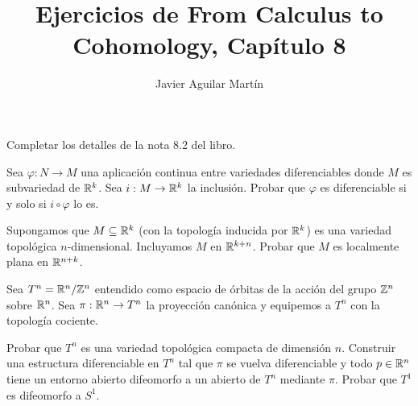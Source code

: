 \documentclass[twoside]{article}
\begin{document}
\title{Ejercicios de From Calculus to Cohomology, Capítulo 8}
\author{Javier Aguilar Martín}
\maketitle


\begin{ejercicio}{8.1}
Completar los detalles de la nota 8.2 del libro.
\end{ejercicio}
\begin{solucion}



\end{solucion}

\newpage

\begin{ejercicio}{8.2}

\end{ejercicio}
\begin{solucion}
Sea $\varphi:N\to M$ una aplicación continua entre variedades diferenciables donde $M$ es subvariedad de $\mathbb{R}^k$. Sea $i:M\to \mathbb{R}^k$ la inclusión. Probar que $\varphi$ es diferenciable si y solo si $i\circ\varphi$ lo es.
\end{solucion}
\newpage

\begin{ejercicio}{8.3}
Supongamos que $M\subseteq\mathbb{R}^k$ (con la topología inducida por $\mathbb{R}^k$) es una variedad topológica $n$-dimensional. Incluyamos $M$ en $\mathbb{R}^{k+n}$. Probar que $M$ es localmente plana en $\mathbb{R}^{n+k}$.
\end{ejercicio}
\begin{solucion}

\end{solucion}
\newpage

\begin{ejercicio}{8.4}
Sea $T^n=\mathbb{R}^n/\mathbb{Z}^n$ entendido como espacio de órbitas de la acción del grupo $\mathbb{Z}^n$ sobre $\mathbb{R}^n$. Sea $\pi:\mathbb{R}^n\to T^n$ la proyección canónica y equipemos a $T^n$ con la topología cociente.

Probar que $T^n$ es una variedad topológica compacta de dimensión $n$. Construir una estructura diferenciable en $T^n$ tal que $\pi$ se vuelva diferenciable y todo $p\in \mathbb{R}^n$ tiene un entorno abierto difeomorfo a un abierto de $T^n$ mediante $\pi$. Probar que $T^1$ es difeomorfo a $S^1$.  
\end{ejercicio}
\begin{solucion}

\end{solucion}
\end{document}
